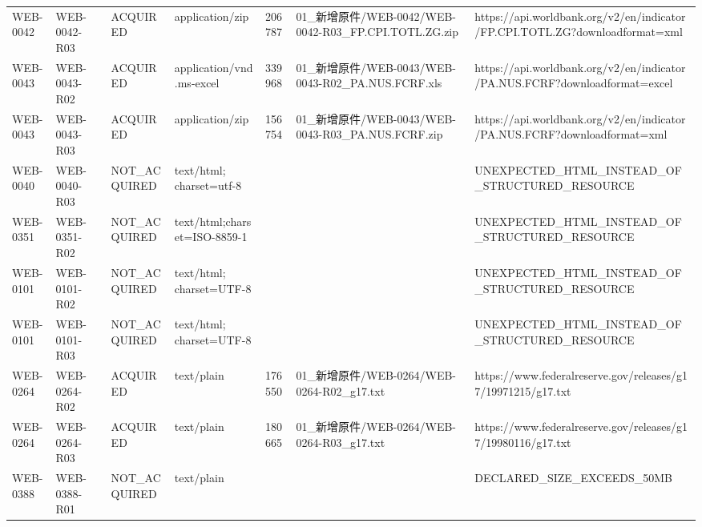 \begin{landscape}
\begin{longtable}{p{1.8cm}p{1.8cm}p{2.6cm}p{3.5cm}p{2.0cm}p{5.0cm}p{6.5cm}}
WEB-0042 & WEB-0042-R03 & ACQUIRED & application/\allowbreak{}zip & 206787 & 01\_\allowbreak{}新增原件/\allowbreak{}WEB-0042/\allowbreak{}WEB-0042-R03\_\allowbreak{}FP.CPI.TOTL.ZG.zip & https:/\allowbreak{}/\allowbreak{}api.worldbank.org/\allowbreak{}v2/\allowbreak{}en/\allowbreak{}indicator/\allowbreak{}FP.CPI.TOTL.ZG?downloadformat=xml\\
WEB-0043 & WEB-0043-R02 & ACQUIRED & application/\allowbreak{}vnd.ms-excel & 339968 & 01\_\allowbreak{}新增原件/\allowbreak{}WEB-0043/\allowbreak{}WEB-0043-R02\_\allowbreak{}PA.NUS.FCRF.xls & https:/\allowbreak{}/\allowbreak{}api.worldbank.org/\allowbreak{}v2/\allowbreak{}en/\allowbreak{}indicator/\allowbreak{}PA.NUS.FCRF?downloadformat=excel\\
WEB-0043 & WEB-0043-R03 & ACQUIRED & application/\allowbreak{}zip & 156754 & 01\_\allowbreak{}新增原件/\allowbreak{}WEB-0043/\allowbreak{}WEB-0043-R03\_\allowbreak{}PA.NUS.FCRF.zip & https:/\allowbreak{}/\allowbreak{}api.worldbank.org/\allowbreak{}v2/\allowbreak{}en/\allowbreak{}indicator/\allowbreak{}PA.NUS.FCRF?downloadformat=xml\\
WEB-0040 & WEB-0040-R03 & NOT\_\allowbreak{}ACQUIRED & text/\allowbreak{}html; charset=utf-8 &  &  & UNEXPECTED\_\allowbreak{}HTML\_\allowbreak{}INSTEAD\_\allowbreak{}OF\_\allowbreak{}STRUCTURED\_\allowbreak{}RESOURCE\\
WEB-0351 & WEB-0351-R02 & NOT\_\allowbreak{}ACQUIRED & text/\allowbreak{}html;charset=ISO-8859-1 &  &  & UNEXPECTED\_\allowbreak{}HTML\_\allowbreak{}INSTEAD\_\allowbreak{}OF\_\allowbreak{}STRUCTURED\_\allowbreak{}RESOURCE\\
WEB-0101 & WEB-0101-R02 & NOT\_\allowbreak{}ACQUIRED & text/\allowbreak{}html; charset=UTF-8 &  &  & UNEXPECTED\_\allowbreak{}HTML\_\allowbreak{}INSTEAD\_\allowbreak{}OF\_\allowbreak{}STRUCTURED\_\allowbreak{}RESOURCE\\
WEB-0101 & WEB-0101-R03 & NOT\_\allowbreak{}ACQUIRED & text/\allowbreak{}html; charset=UTF-8 &  &  & UNEXPECTED\_\allowbreak{}HTML\_\allowbreak{}INSTEAD\_\allowbreak{}OF\_\allowbreak{}STRUCTURED\_\allowbreak{}RESOURCE\\
WEB-0264 & WEB-0264-R02 & ACQUIRED & text/\allowbreak{}plain & 176550 & 01\_\allowbreak{}新增原件/\allowbreak{}WEB-0264/\allowbreak{}WEB-0264-R02\_\allowbreak{}g17.txt & https:/\allowbreak{}/\allowbreak{}www.federalreserve.gov/\allowbreak{}releases/\allowbreak{}g17/\allowbreak{}19971215/\allowbreak{}g17.txt\\
WEB-0264 & WEB-0264-R03 & ACQUIRED & text/\allowbreak{}plain & 180665 & 01\_\allowbreak{}新增原件/\allowbreak{}WEB-0264/\allowbreak{}WEB-0264-R03\_\allowbreak{}g17.txt & https:/\allowbreak{}/\allowbreak{}www.federalreserve.gov/\allowbreak{}releases/\allowbreak{}g17/\allowbreak{}19980116/\allowbreak{}g17.txt\\
WEB-0388 & WEB-0388-R01 & NOT\_\allowbreak{}ACQUIRED & text/\allowbreak{}plain &  &  & DECLARED\_\allowbreak{}SIZE\_\allowbreak{}EXCEEDS\_\allowbreak{}50MB\\
\bottomrule\end{longtable}\endgroup\end{landscape}
